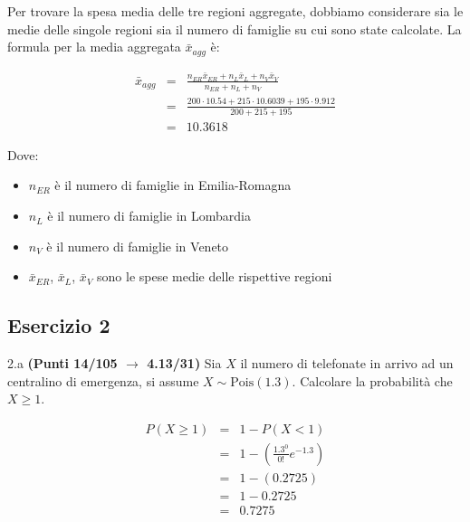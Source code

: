 \documentclass[
  11pt,
]{book}
\providecommand{\tightlist}{%
  \setlength{\itemsep}{0pt}\setlength{\parskip}{0pt}}
\theoremstyle{mytheoremstyle}
\theoremstyle{mydefstyle}
\newenvironment{sol}
  {
  \begin{tcolorbox}[enhanced,breakable,arc=0.1mm,boxrule=1pt,colback=white,colframe=iblue,
  title=\bf \fontfamily{lmss}\selectfont \hspace{.5 cm} Soluzione,drop fuzzy shadow]

}{
\end{tcolorbox}
  }
\begin{document}
\begin{sol}

Per trovare la spesa media delle tre regioni aggregate, dobbiamo considerare sia le medie delle singole regioni sia il numero di famiglie su cui sono state calcolate. La formula per la media aggregata \(\bar{x}_{agg}\) è:

\begin{eqnarray*}
\bar{x}_{agg}    &=&  \frac{n_{ER} \bar{x}_{ER} + n_{L} \bar{x}_{L} + n_{V} \bar{x}_{V}}{n_{ER} + n_{L} + n_{V}}\\
&=& \frac{200\cdot10.54+215\cdot10.6039+195\cdot9.912}{200+215+195}\\
&=& 10.3618
\end{eqnarray*}

Dove:

\begin{itemize}
\tightlist
\item
  \(n_{ER}\) è il numero di famiglie in Emilia-Romagna
\item
  \(n_{L}\) è il numero di famiglie in Lombardia
\item
  \(n_{V}\) è il numero di famiglie in Veneto
\item
  \(\bar{x}_{ER}\), \(\bar{x}_{L}\), \(\bar{x}_{V}\) sono le spese medie delle rispettive regioni
\end{itemize}

\end{sol}

\subsection{Esercizio 2}\label{esercizio-2-41}

2.a \textbf{(Punti 14/105 \(\rightarrow\) 4.13/31)} Sia \(X\) il numero di telefonate in arrivo ad un centralino di emergenza, si assume \(X\sim\text{Pois}(1.3)\). Calcolare la probabilità che \(X\geq 1\).

\begin{sol}
\begin{eqnarray*}
   P( X \geq 1 ) &=& 1-P( X < 1 ) \\                 &=& 1-\left( \frac{ 1.3 ^{ 0 }}{ 0 !}e^{- 1.3 } \right)\\                 &=& 1-( 0.2725 )\\                 &=& 1- 0.2725 \\                 &=&   0.7275 
\end{eqnarray*}

\end{sol}
\end{document}
